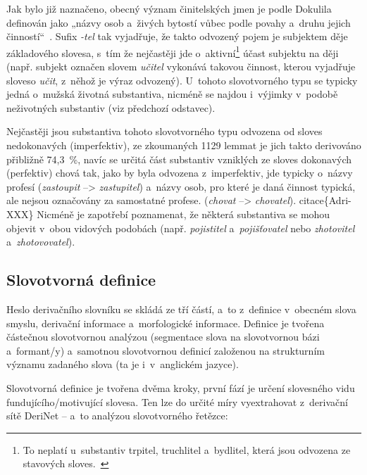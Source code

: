 Jak bylo již naznačeno, obecný význam činitelských jmen je podle
Dokulila definován jako „názvy osob a~živých bytostí vůbec podle povahy
a~druhu jejich činností``~\parencite[17]{dokulil67}. Sufix \emph{-tel}
tak vyjadřuje, že takto odvozený pojem je subjektem děje základového
slovesa, s~tím že nejčastěji jde
o~aktivní\footnote{To neplatí u~substantiv trpitel, truchlitel a~bydlitel, která jsou odvozena ze stavových sloves.~\parencite[17]{dokulil67}}
účast subjektu na ději (např. subjekt označen slovem \emph{učitel}
vykonává takovou činnost, kterou vyjadřuje sloveso \emph{učit}, z~něhož
je výraz odvozený). U~tohoto slovotvorného typu se typicky jedná
o~mužská životná substantiva, nicméně se najdou i~výjimky v~podobě
neživotných substantiv (viz předchozí odstavec).~\parencite{simandl2016}

Nejčastěji jsou substantiva tohoto slovotvorného typu odvozena od sloves
nedokonavých (imperfektiv), ze zkoumaných 1129 lemmat je jich takto
derivováno přibližně 74,3~\%, navíc se určitá část substantiv vzniklých
ze sloves dokonavých (perfektiv) chová tak, jako by byla odvozena
z~imperfektiv, jde typicky o~názvy profesí (\emph{zastoupit}
--\textgreater{} \emph{zastupitel}) a~názvy osob, pro které je daná
činnost typická, ale nejsou označovány za samostatné profese.
(\emph{chovat} --\textgreater{} \emph{chovatel}). citace\{Adri-XXX\}
Nicméně je zapotřebí poznamenat, že některá substantiva se mohou objevit
v~obou vidových podobách (např. \emph{pojistitel} a~\emph{pojišťovatel}
nebo \emph{zhotovitel} a~\emph{zhotovovatel}).~\parencite{simandl2016}

\hypertarget{slovotvornuxe1-definice}{%
\subsection{Slovotvorná definice}\label{slovotvornuxe1-definice}}

Heslo derivačního slovníku se skládá ze tří částí, a~to z~definice
v~obecném slova smyslu, derivační informace a~morfologické informace.
Definice je tvořena částečnou slovotvornou analýzou (segmentace slova na
slovotvornou bázi a~formant/y) a~samotnou slovotvornou definicí
založenou na strukturním významu zadaného slova (ta je i~v~anglickém
jazyce).

Slovotvorná definice je tvořena dvěma kroky, první fází je určení
slovesného vidu fundujícího/motivující slovesa. Ten lze do určité míry
vyextrahovat z~derivační sítě DeriNet -- a~to analýzou slovotvorného
řetězce:

